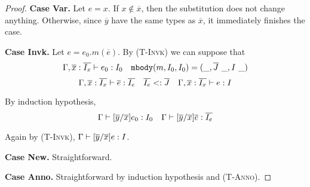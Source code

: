 \begin{lemma}
\begin{proof}
\textbf{Case Var.} Let $e = x$. If $x \notin \overline{x}$, then the substitution does not change anything. Otherwise,
since $\overline{y}$ have the same types as $\overline{x}$, it immediately finishes the case.

\textbf{Case Invk.} Let $e = e_0.m(\overline{e})$. By \textsc{(T-Invk)} we can suppose that
	$$\judgeewf {\Gamma, \overline{x}:\overline{I_x}} {e_0 : I_0} \quad \mbody(m, I_0, I_0) = (\_, \overline{J}\ \_, I\ \_)$$
	$$\Gamma, \overline{x}:\overline{I_x} \; {\vdash} \; \overline{e} : \overline{I_e} \quad 
	\overline{I_e} <: \overline{J} \quad \Gamma, \overline{x}:\overline{I_x} \; {\vdash} \; e : I$$
	
By induction hypothesis, 
	$$\Gamma \; {\vdash} \; [\overline{y}/\overline{x}]e_0 : I_0 \quad
	  \Gamma \; {\vdash} \; [\overline{y}/\overline{x}]\overline{e} : \overline{I_e}$$
	  
Again by \textsc{(T-Invk)}, $\Gamma \; {\vdash} \; [\overline{y}/\overline{x}]e : I$.

\begin{comment}
\textbf{Case PathInvk.} $e = e_0.J_0?m(\overline{e})$. By \textsc{(T-PathInvk)}, suppose
	$$\judgeewf {\Gamma, \overline{x}:\overline{I_x}} {e_0 : I_0} \quad I_0 \subtype J_0$$
	$$\mbody(m, I_0, J_0) = (\_, \overline{J}\ \_, I\ \_)$$
	$$\judgeewf {\Gamma, \overline{x}:\overline{I_x}} {\overline{e} : \overline{I_e}} \quad 
	  \overline{I_e} \subtype \overline{J} \quad \judgeewf {\Gamma, \overline{x}:\overline{I_x}} {e : I}$$

By induction hypothesis, 
$$\judgeewf {\Gamma} {[\overline{y}/\overline{x}]e_0 : I_0} \quad
\judgeewf {\Gamma} {[\overline{y}/\overline{x}]\overline{e} : \overline{I_e}}$$ 

Again by \textsc{(T-PathInvk)}, $\judgeewf {\Gamma} {[\overline{y}/\overline{x}]e : I}$.
\end{comment}

\textbf{Case New.} Straightforward.

\textbf{Case Anno.} Straightforward by induction hypothesis and \textsc{(T-Anno)}.


\end{proof}

\end{lemma}



